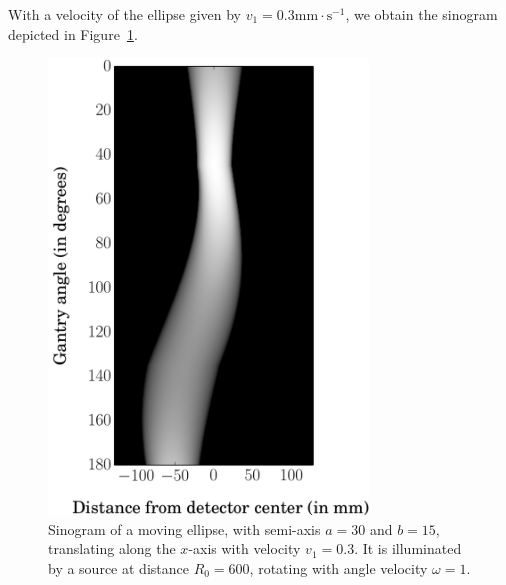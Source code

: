 \documentclass[9pt,technote]{IEEEtran}
\numberwithin{equation}{section}
\begin{document}
With a velocity of the ellipse given by $v_1 = 0.3 \textrm{mm} \cdot \textrm{s}^{-1}$, we obtain the sinogram depicted in Figure~\ref{fig:sinogram}.
\begin{figure}[!ht]
	\centering
	\includegraphics[width=85mm]{figs/sinogram.png}
	\caption{Sinogram of a moving ellipse, with semi-axis $a = 30$ and $b = 15$, translating along the $x$-axis with velocity $v_1 = 0.3$. It is illuminated by a source at distance $R_0 = 600$, rotating with angle velocity $\omega = 1$.\label{fig:sinogram}}
\end{figure}
\end{document}
